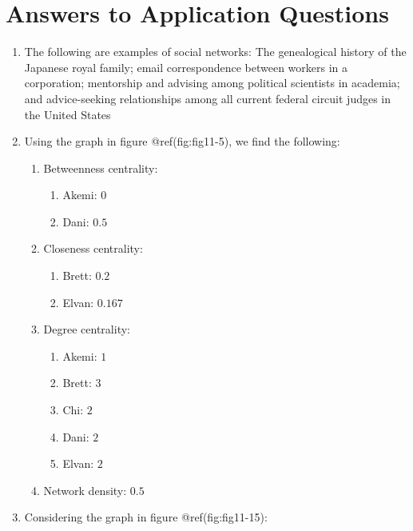 \documentclass{book}
\begin{document}
\hypertarget{answers-to-application-questions-5}{%
\section{Answers to Application
Questions}\label{answers-to-application-questions-5}}

\begin{enumerate}
\def\labelenumi{\arabic{enumi}.}
\item
  The following are examples of social networks: The genealogical history of
  the Japanese royal family; email correspondence between workers in a
  corporation; mentorship and advising among political scientists in academia;
  and advice-seeking relationships among all current federal circuit judges in
  the United States
\item
  Using the graph in figure @ref(fig:fig11-5), we find the following:

  \begin{enumerate}
  \def\labelenumii{\arabic{enumii}.}
  \item
    Betweenness centrality:

    \begin{enumerate}
    \def\labelenumiii{\arabic{enumiii}.}
    \item
      Akemi: \(0\)
    \item
      Dani: \(0.5\)
    \end{enumerate}
  \item
    Closeness centrality:

    \begin{enumerate}
    \def\labelenumiii{\arabic{enumiii}.}
    \item
      Brett: \(0.2\)
    \item
      Elvan: \(0.167\)
    \end{enumerate}
  \item
    Degree centrality:

    \begin{enumerate}
    \def\labelenumiii{\arabic{enumiii}.}
    \item
      Akemi: \(1\)
    \item
      Brett: \(3\)
    \item
      Chi: \(2\)
    \item
      Dani: \(2\)
    \item
      Elvan: \(2\)
    \end{enumerate}
  \item
    Network density: \(0.5\)
  \end{enumerate}
\item
  Considering the graph in figure @ref(fig:fig11-15):


\end{enumerate}
\end{document}
